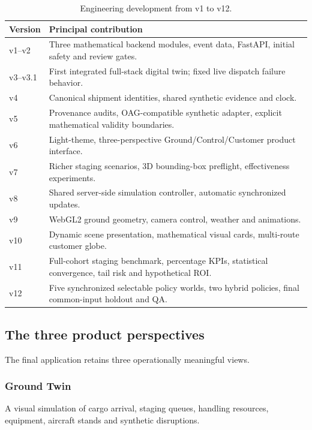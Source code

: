\documentclass[10pt,a4paper]{article}
\theoremstyle{plain}
\theoremstyle{definition}
\theoremstyle{remark}
\begin{document}
\begin{table}[!htbp]
\centering
\caption{Engineering development from v1 to v12.}
\label{tab:versions}
\small
\begin{tabularx}{\linewidth}{@{}p{16mm}L@{}}
\toprule
\textbf{Version} & \textbf{Principal contribution} \\
\midrule
v1--v2 &
Three mathematical backend modules,
event data, FastAPI,
initial safety and review gates. \\
v3--v3.1 &
First integrated full-stack digital twin;
fixed live dispatch failure behavior. \\
v4 &
Canonical shipment identities,
shared synthetic evidence and clock. \\
v5 &
Provenance audits,
OAG-compatible synthetic adapter,
explicit mathematical validity boundaries. \\
v6 &
Light-theme, three-perspective
Ground/Control/Customer product interface. \\
v7 &
Richer staging scenarios,
3D bounding-box preflight,
effectiveness experiments. \\
v8 &
Shared server-side simulation controller,
automatic synchronized updates. \\
v9 &
WebGL2 ground geometry,
camera control, weather and animations. \\
v10 &
Dynamic scene presentation,
mathematical visual cards,
multi-route customer globe. \\
v11 &
Full-cohort staging benchmark,
percentage KPIs, statistical convergence,
tail risk and hypothetical ROI. \\
v12 &
Five synchronized selectable policy worlds,
two hybrid policies,
final common-input holdout and QA. \\
\bottomrule
\end{tabularx}
\end{table}

\subsection{The three product perspectives}

The final application retains three
operationally meaningful views.

\subsubsection{Ground Twin}

A visual simulation of cargo arrival,
staging queues, handling resources,
equipment, aircraft stands and
synthetic disruptions.
\end{document}
